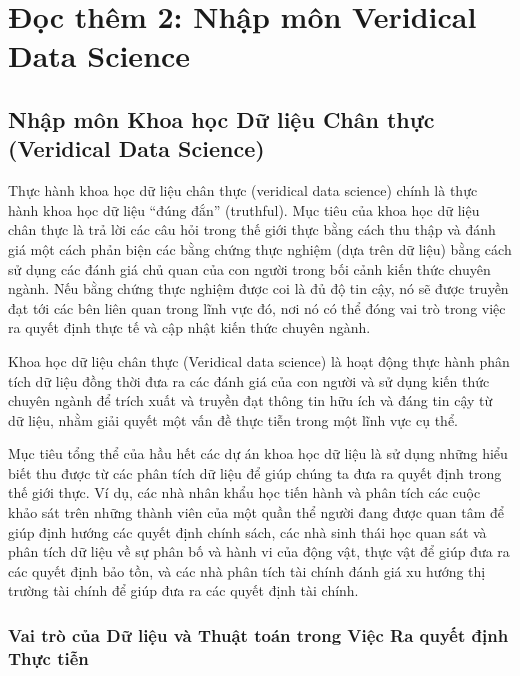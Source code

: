 \chapter{Đọc thêm 2: Nhập môn Veridical Data Science}
\label{ch:M1L1-reading2}

\section{Nhập môn Khoa học Dữ liệu Chân thực (Veridical Data Science)}

Thực hành khoa học dữ liệu chân thực (veridical data science) chính là thực hành khoa học dữ liệu “đúng đắn” (truthful). Mục tiêu của khoa học dữ liệu chân thực là trả lời các câu hỏi trong thế giới thực bằng cách thu thập và đánh giá một cách phản biện các bằng chứng thực nghiệm (dựa trên dữ liệu) bằng cách sử dụng các đánh giá chủ quan của con người trong bối cảnh kiến thức chuyên ngành. Nếu bằng chứng thực nghiệm được coi là đủ độ tin cậy, nó sẽ được truyền đạt tới các bên liên quan trong lĩnh vực đó, nơi nó có thể đóng vai trò trong việc ra quyết định thực tế và cập nhật kiến thức chuyên ngành.

\begin{tcolorbox}[title={Hộp 1.1: Veridical Data Science}]
Khoa học dữ liệu chân thực (Veridical data science) là hoạt động thực hành phân tích dữ liệu đồng thời đưa ra các đánh giá của con người và sử dụng kiến thức chuyên ngành để trích xuất và truyền đạt thông tin hữu ích và đáng tin cậy từ dữ liệu, nhằm giải quyết một vấn đề thực tiễn trong một lĩnh vực cụ thể.
\end{tcolorbox}

Mục tiêu tổng thể của hầu hết các dự án khoa học dữ liệu là sử dụng những hiểu biết thu được từ các phân tích dữ liệu để giúp chúng ta đưa ra quyết định trong thế giới thực. Ví dụ, các nhà nhân khẩu học tiến hành và phân tích các cuộc khảo sát trên những thành viên của một quần thể người đang được quan tâm để giúp định hướng các quyết định chính sách, các nhà sinh thái học quan sát và phân tích dữ liệu về sự phân bố và hành vi của động vật, thực vật để giúp đưa ra các quyết định bảo tồn, và các nhà phân tích tài chính đánh giá xu hướng thị trường tài chính để giúp đưa ra các quyết định tài chính.

\subsection{Vai trò của Dữ liệu và Thuật toán trong Việc Ra quyết định Thực tiễn}

